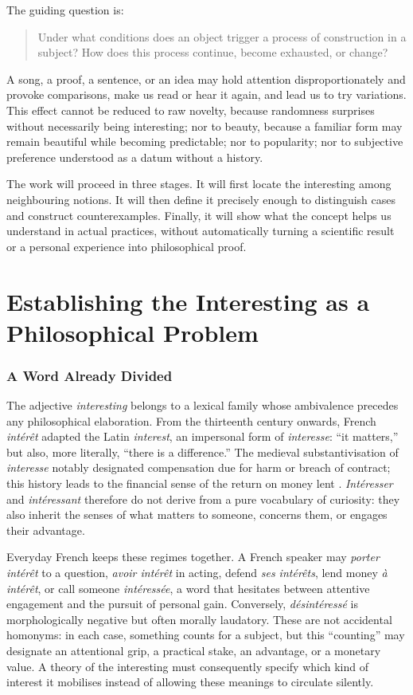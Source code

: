 \documentclass[11pt,a4paper]{article}
\begin{document}
The guiding question is:

\begin{quote}
Under what conditions does an object trigger a process of construction in a
subject? How does this process continue, become exhausted, or change?
\end{quote}

A song, a proof, a sentence, or an idea may hold attention disproportionately
and provoke comparisons, make us read or hear it again, and lead us to try
variations. This effect cannot be
reduced to raw novelty, because randomness surprises without necessarily being
interesting; nor to beauty, because a familiar form may remain beautiful while
becoming predictable; nor to popularity; nor to subjective preference
understood as a datum without a history.

The work will proceed in three stages. It will first locate the interesting
among neighbouring notions. It will then define it precisely enough to
distinguish cases and construct counterexamples. Finally, it will show what the
concept helps us understand in actual practices, without
automatically turning a scientific result or a personal experience into
philosophical proof.

\part{Establishing the Interesting as a Philosophical Problem}

\section{A Word Already Divided}

The adjective \emph{interesting} belongs to a lexical family whose ambivalence
precedes any philosophical elaboration. From the thirteenth century onwards,
French \emph{intérêt} adapted the Latin \emph{interest}, an impersonal form of
\emph{interesse}: ``it matters,'' but also, more literally, ``there is a
difference.'' The medieval substantivisation of \emph{interesse} notably
designated compensation due for harm or breach of contract; this history leads
to the financial sense of the return on money lent
\parencite{academie2026interet,cnrtl2026interet}. \emph{Intéresser} and
\emph{intéressant} therefore do not derive from a pure vocabulary of curiosity:
they also inherit the senses of what matters to someone, concerns them, or
engages their advantage.

Everyday French keeps these regimes together. A French speaker may \emph{porter
intérêt} to a question, \emph{avoir intérêt} in acting, defend \emph{ses
intérêts}, lend money \emph{à intérêt}, or call someone \emph{intéressée}, a
word that hesitates between attentive engagement and the pursuit of personal gain.
Conversely, \emph{désintéressé} is morphologically negative but often morally
laudatory. These are not accidental homonyms: in each case, something counts
for a subject, but this ``counting'' may designate an attentional grip, a
practical stake, an advantage, or a monetary value. A theory of the interesting
must consequently specify which kind of interest it mobilises instead of
allowing these meanings to circulate silently.
\end{document}
